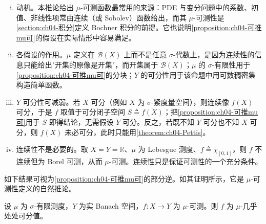 \documentclass[../../main.tex]{subfiles}%
\begin{document}
\begin{remark}\label{remark:ch04-连续可测动机}
\begin{enumerate}[(i)]
\item 动机。本推论给出 $\mu$-可测函数最常用的来源：PDE 与变分问题中的系数、初值、非线性项常由连续（或 Sobolev）函数给出，而其 $\mu$-可测性是\cref{section:ch04-积分}定义 Bochner 积分的前提。它也说明\cref{proposition:ch04-可推mu可}的假设在实际情形中容易满足。
\item 各假设的作用。$\mu$ 定义在 $\mathcal{B}(X)$ 上而不是任意 $\sigma$-代数上，是因为连续性的信息只能给出"开集的原像是开集"，而开集属于 $\mathcal{B}(X)$；$\mu$ 的 $\sigma$-有限性用于\cref{proposition:ch04-可推mu可}的分块；$Y$ 的可分性用于该命题中用可数稠密集构造简单函数。
\item $Y$ 可分性可减弱。若 $X$ 可分（例如 $X$ 为 $\sigma$-紧度量空间），则连续像 $f(X)$ 可分，于是 $f$ 取值于可分闭子空间 $S\triangleq\overline{f(X)}$；把\cref{proposition:ch04-可推mu可}用于 $S$ 即得结论，无需假设 $Y$ 可分。反之，若既不知 $Y$ 可分也不知 $X$ 可分，则 $f(X)$ 未必可分，此时只能用\cref{theorem:ch04-Pettis}。
\item 连续性不是必要的。取 $X=Y=\mathbb{R}$、$\mu$ 为 Lebesgue 测度、$f\triangleq\chi_{[0,1]}$，则 $f$ 不连续但为 Borel 可测，从而 $\mu$-可测。连续性只是保证可测性的一个充分条件。
\end{enumerate}
\end{remark}

如下结果可视为\cref{proposition:ch04-可推mu可}的部分逆。如其证明所示，它是 $\mu$-可测性定义的自然推论。

\begin{proposition}\label{proposition:ch04-mu可推可分值}
设 $\mu$ 为 $\sigma$-有限测度，$Y$ 为实 Banach 空间，$f:X\to Y$ 为 $\mu$-可测。则 $f$ 为 $\mu$-几乎处处可分值。
\end{proposition}
\end{document}
